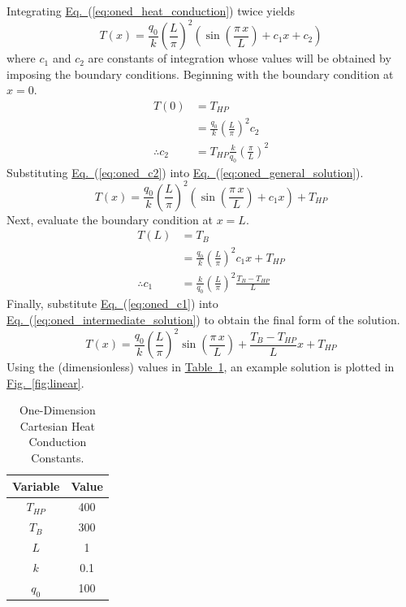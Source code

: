 \documentclass{article}
\newcommand{\eref}[1]{\hyperref[#1]{Eq.~}(\ref{#1})}
\newcommand{\fref}[1]{\hyperref[#1]{Fig.~}\ref{#1}}
\newcommand{\tref}[1]{\hyperref[#1]{Table~}\ref{#1}}
\begin{document}
Integrating \eref{eq:oned_heat_conduction} twice yields
\begin{equation}
  \label{eq:oned_general_solution}
  T(x) = \frac{q_0}{k} \left( \frac{L}{\pi} \right)^2 \left( \sin \left( \frac{\pi \, x}{L} \right) + c_1 x + c_2 \right)
\end{equation}
where $c_1$ and $c_2$ are constants of integration whose values will be obtained by imposing the boundary conditions.
Beginning with the boundary condition at $x=0$.
\begin{align}
  T(0) &= T_{HP} \\
  &= \frac{q_0}{k} \left( \frac{L}{\pi} \right)^2 c_2  \\
  \label{eq:oned_c2}
  \therefore c_2 &= T_{HP} \frac{k}{q_0} \left( \frac{\pi}{L} \right)^2
\end{align}
Substituting \eref{eq:oned_c2} into \eref{eq:oned_general_solution}.
\begin{equation}
  \label{eq:oned_intermediate_solution}
  T(x) = \frac{q_0}{k} \left( \frac{L}{\pi} \right)^2 \left( \sin \left( \frac{\pi \, x}{L} \right) + c_1 x \right) + T_{HP}
\end{equation}
Next, evaluate the boundary condition at $x=L$.
\begin{align}
  T(L) &= T_B \\
  &= \frac{q_0}{k} \left( \frac{L}{\pi} \right)^2 c_1 x + T_{HP} \\
  \label{eq:oned_c1}
  \therefore c_1 &= \frac{k}{q_0} \left( \frac{L}{\pi} \right)^2 \frac{T_B - T_{HP}}{L}
\end{align}
Finally, substitute \eref{eq:oned_c1} into \eref{eq:oned_intermediate_solution} to obtain the final form of the solution.
\begin{equation}
  \label{eq:oned_solution}
  T(x) = \frac{q_0}{k} \left( \frac{L}{\pi} \right)^2 \sin \left( \frac{\pi \, x}{L} \right) + \frac{T_B - T_{HP}}{L} x + T_{HP}
\end{equation}
Using the (dimensionless) values in \tref{tab:oned}, an example solution is plotted in \fref{fig:linear}.

\begin{table}
  \centering
  \caption{One-Dimension Cartesian Heat Conduction Constants.}
  \label{tab:oned}
  \begin{tabular}{cc}
    \\
    \toprule
    Variable & Value \\
    \midrule
    $T_{HP}$ & 400 \\
    $T_{B}$  & 300 \\
    $L$      & 1   \\
    $k$      & 0.1 \\
    $q_0$    & 100 \\
    \bottomrule
  \end{tabular}
\end{table}
\end{document}
